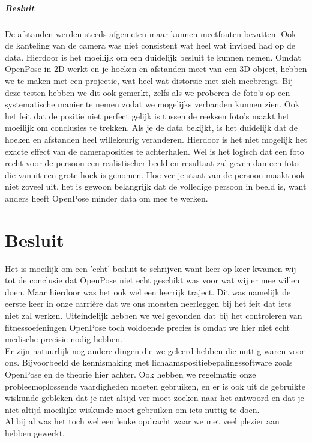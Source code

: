 \documentclass[a4paper,twoside,kulak]{kulakreport}
\begin{document}
\paragraph{Besluit}
De afstanden werden steeds afgemeten maar kunnen meetfouten bevatten. Ook de kanteling van de camera was niet consistent wat heel wat invloed had op de data. Hierdoor is het moeilijk om een duidelijk besluit te kunnen nemen. Omdat OpenPose in 2D werkt en je hoeken en afstanden meet van een 3D object, hebben we te maken met een projectie, wat heel wat distorsie met zich meebrengt. Bij deze testen hebben we dit ook gemerkt, zelfs als we proberen de foto’s op een systematische manier te nemen zodat we mogelijks verbanden kunnen zien. Ook het feit dat de positie niet perfect gelijk is tussen de reeksen foto’s maakt het moeilijk om conclusies te trekken. Als je de data bekijkt, is het duidelijk dat de hoeken en afstanden heel willekeurig veranderen. Hierdoor is het niet mogelijk het exacte effect van de cameraposities te achterhalen. Wel is het logisch dat een foto recht voor de persoon een realistischer beeld en resultaat zal geven dan een foto die vanuit een grote hoek is genomen. Hoe ver je staat van de persoon maakt ook niet zoveel uit, het is gewoon belangrijk dat de volledige persoon in beeld is, want anders heeft OpenPose minder data om mee te werken.

\chapter*{Besluit}
Het is moeilijk om een 'echt' besluit te schrijven want keer op keer kwamen wij tot de conclusie dat OpenPose niet echt geschikt was voor wat wij er mee willen doen. Maar hierdoor was het ook wel een leerrijk traject. Dit was namelijk de eerste keer in onze carrière dat we ons moesten neerleggen bij het feit dat iets niet zal werken. Uiteindelijk hebben we  wel gevonden dat bij het controleren van fitnessoefeningen OpenPose  toch voldoende precies is omdat we hier niet echt medische precisie nodig hebben. \\
Er zijn natuurlijk nog andere dingen die we  geleerd hebben die nuttig waren voor ons. Bijvoorbeeld de kennismaking met lichaamspositiebepalingssoftware zoals OpenPose en de theorie hier achter. Ook hebben we regelmatig onze probleemoplossende vaardigheden moeten gebruiken, en er is ook uit de gebruikte wiskunde gebleken dat je niet altijd ver moet zoeken naar het antwoord en dat je niet altijd moeilijke wiskunde moet gebruiken om iets nuttig te doen.\\
Al bij al was het toch wel een leuke opdracht waar we met veel plezier aan hebben gewerkt.
\end{document}
